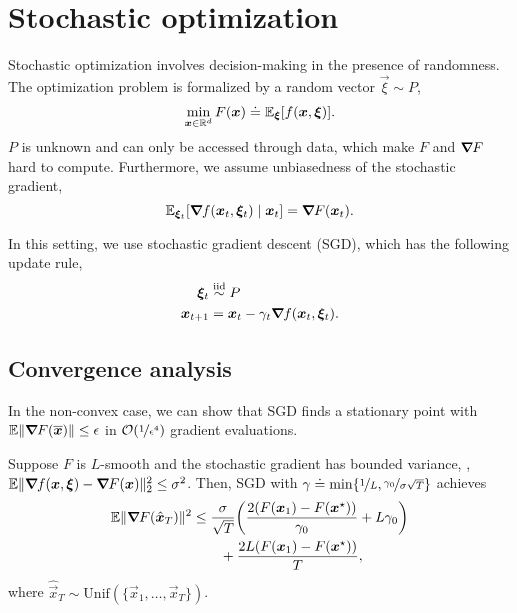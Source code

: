 \section{Stochastic optimization}

Stochastic optimization involves decision-making in the presence of randomness. The optimization
problem is formalized by a random vector $\vec{\xi} \sim P$, \[
    \min_{\bm{x} \in \mathbb{R}^d} F(\bm{x}) \doteq \mathbb{E}_{\bm{\xi}}[f(\bm{x}, \bm{\xi})].
\]
$P$ is unknown and can only be accessed through data, which make $F$ and $\bm{\nabla}_{\! } F$ hard to
compute. Furthermore, we assume unbiasedness of the stochastic gradient, \[
    \mathbb{E}_{\bm{\xi}_t}[\bm{\nabla}_{\! } f(\bm{x}_t, \bm{\xi}_t) \mid \bm{x}_t] = \bm{\nabla}_{\! } F(\bm{x}_t).
\]

In this setting, we use stochastic gradient descent (SGD), which has the following update rule,
\begin{align*}
    \bm{\xi}_t   & \overset{\mathrm{iid}}{\sim} P                                               \\
    \bm{x}_{t+1} & = \bm{x}_t - \gamma_t \bm{\nabla}_{\! } f(\bm{x}_t, \bm{\xi}_t).
\end{align*}

\subsection{Convergence analysis}

In the non-convex case, we can show that SGD finds a stationary point with $\mathbb{E} \|
    \bm{\nabla}_{\! } F(\overline{\bm{x}}) \| \leq \epsilon$ in $\bigo{\nicefrac{1}{\epsilon^4}}$ gradient
evaluations.

\begin{theorem}
    Suppose $F$ is $L$-smooth and the stochastic gradient has bounded variance, \ie, $\mathbb{E} \|
        \bm{\nabla}_{\! } f(\bm{x}, \bm{\xi}) - \bm{\nabla}_{\! } F(\bm{x}) \|_2^2 \leq \sigma^2$. Then, SGD with
    $\gamma \doteq \min \lft\{ \nicefrac{1}{L}, \nicefrac{\gamma_0}{\sigma \sqrt{T}} \rgt\}$ achieves
    \begin{align*}
        \E \| \grad{F(\hat{\vec{x}}_T)}{} \|^2 & \leq \frac{\sigma}{\sqrt{T}} \lft( \frac{2 (F(\vec{x}_1) - F(\vec{x}^\star))}{\gamma_0} + L \gamma_0 \rgt) \\
                                               & \qquad + \frac{2L(F(\vec{x}_1) - F(\vec{x}^\star))}{T},
    \end{align*}
    where $\hat{\vec{x}}_T \sim \mathrm{Unif}(\{ \vec{x}_1, \ldots, \vec{x}_T \})$.
\end{theorem}

